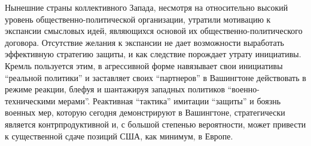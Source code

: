 Нынешние страны коллективного Запада, несмотря на относительно высокий уровень
общественно-политической организации, утратили мотивацию к экспансии смысловых
идей, являющихся основой их общественно-политического договора. Отсутствие
желания к экспансии не дает возможности выработать эффективную стратегию
защиты, и как следствие порождает утрату инициативы. Кремль пользуется этим, в
агрессивной форме навязывает свои инициативы \enquote{реальной политики} и
заставляет своих \enquote{партнеров} в Вашингтоне действовать в режиме реакции,
блефуя и шантажируя западных политиков \enquote{военно-техническими мерами}.
Реактивная \enquote{тактика} имитации \enquote{защиты} и боязнь военных мер,
которую сегодня демонстрируют в Вашингтоне, стратегически является
контрпродуктивной и, с большой степенью вероятности, может привести к
существенной сдаче позиций США, как минимум, в Европе.
